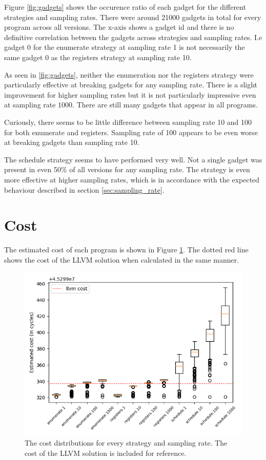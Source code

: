 Figure \ref{fig:gadgets} shows the occurence ratio of each gadget for the different
strategies and sampling rates. There were around 21000 gadgets in total for every program
across all versions. The x-axis shows a gadget id and there is no definitive correlation
between the gadgets across strategies and sampling rates. I.e gadget 0 for the enumerate
strategy at sampling rate 1 is not necessarily the same gadget 0 as the registers strategy
at sampling rate 10.

As seen in \ref{fig:gadgets}, neither the enumeration nor the registers strategy were
particularly effective at breaking gadgets for any sampling rate. There is a slight
improvement for higher sampling rates but it is not particularly impressive even at
sampling rate 1000. There are still many gadgets that appear in all programs.

Curiously, there seems to be little difference between sampling rate 10 and 100 for both
enumerate and registers. Sampling rate of 100 appears to be even worse at breaking gadgets
than sampling rate 10.

The schedule strategy seems to have performed very well. Not a single gadget was present
in even 50\% of all versions for any sampling rate. The strategy is even more effective at
higher sampling rates, which is in accordance with the expected behaviour described in
section \ref{sec:sampling_rate}.

\section{Cost}

The estimated cost of each program is shown in Figure \ref{fig:cost}. The dotted red line
shows the cost of the LLVM solution when calculated in the same manner.

\begin{figure}[h]
	\centering
	\includegraphics[width=\textwidth,height=0.5\textheight]{results/figures/cost}
	\caption{The cost distributions for every strategy and sampling rate. The cost of the LLVM solution is included for reference.}
	\label{fig:cost}
\end{figure}

